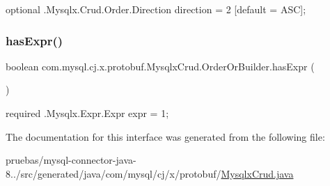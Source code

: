 {\ttfamily optional .Mysqlx.\+Crud.\+Order.\+Direction direction = 2 \mbox{[}default = A\+SC\mbox{]};} \mbox{\label{interfacecom_1_1mysql_1_1cj_1_1x_1_1protobuf_1_1_mysqlx_crud_1_1_order_or_builder_a2b5f18b18a73c655dac716f4d5c0efd7}} 
\subsubsection{\texorpdfstring{has\+Expr()}{hasExpr()}}
{\footnotesize\ttfamily boolean com.\+mysql.\+cj.\+x.\+protobuf.\+Mysqlx\+Crud.\+Order\+Or\+Builder.\+has\+Expr (\begin{DoxyParamCaption}{ }\end{DoxyParamCaption})}

{\ttfamily required .Mysqlx.\+Expr.\+Expr expr = 1;} 

The documentation for this interface was generated from the following file\+:\begin{DoxyCompactItemize}
\item 
pruebas/mysql-\/connector-\/java-\/8../src/generated/java/com/mysql/cj/x/protobuf/\mbox{\hyperlink{_mysqlx_crud_8java}{Mysqlx\+Crud.\+java}}\end{DoxyCompactItemize}

